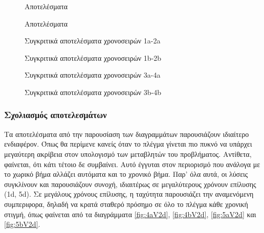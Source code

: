 \begin{figure}[h]
	\centering
	\caption{Αποτελέσματα }
\end{figure}
\begin{figure}[h]
	\centering
	\caption{Αποτελέσματα }
\end{figure}
\begin{figure}[h]
	\centering
	\caption{Συγκριτικά αποτελέσματα χρονοσειρών 1a-2a}
\end{figure}
\begin{figure}[h]
	\centering
	\caption{Συγκριτικά αποτελέσματα χρονοσειρών 1b-2b}
\end{figure}
\begin{figure}[h]
	\centering
	\caption{Συγκριτικά αποτελέσματα χρονοσειρών 3a-4a}
\end{figure}
\begin{figure}[h]
	\centering
	\caption{Συγκριτικά αποτελέσματα χρονοσειρών 3b-4b}
\end{figure}

\cleardoublepage
\subsubsection{Σχολιασμός αποτελεσμάτων}
Τα αποτελέσματα από την παρουσίαση των διαγραμμάτων παρουσιάζουν ιδιαίτερο ενδιαφέρον. Όπως θα περίμενε κανείς όταν το πλέγμα γίνεται πιο πυκνό να υπάρχει μεγαύτερη ακρίβεια στον υπολογισμό των μεταβλητών του προβλήματος. Αντίθετα, φαίνεται, ότι κάτι τέτοιο δε συμβαίνει. Αυτό έγγυται στον περιορισμό  που ανάλογα με το χωρικό βήμα αλλάζει αυτόματα και το χρονικό βήμα. Παρ' όλα αυτά, οι λύσεις συγκλίνουν και παρουσιάζουν συνοχή, ιδιαιτέρως σε μεγαλύτερους χρόνουν επίλυσης (1d, 5d).
Σε μεγάλους χρόνους επίλυσης, η ταχύτητα παρουσιάζει την αναμενόμενη συμπεριφορα, δηλαδή να κρατά σταθερό πρόσημο σε όλο το πλέγμα κάθε χρονική στιγμή, όπως φαίνεται από τα διαγράμματα \ref{fig:4aV2d}, \ref{fig:4bV2d}, \ref{fig:5aV2d} και \ref{fig:5bV2d}. 

